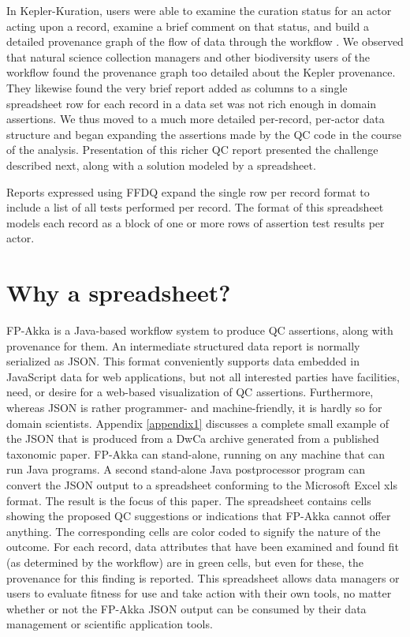 \documentclass{article}
\begin{document}
In Kepler-Kuration, users were able to examine the curation status for an actor acting upon a record, examine a brief comment on that status, and build a detailed 
provenance graph of the flow of data through the workflow \citep{dou_kurator_2012}.   
We observed that natural science collection managers and other biodiversity users of the workflow found the provenance graph too detailed about the Kepler provenance.  They likewise found the very brief report added as columns to a single spreadsheet row for each record in a data set was  not rich enough in domain assertions.  We thus moved to a much more detailed per-record, per-actor data structure and began expanding the assertions made by the QC code in the course of the analysis.  Presentation of this richer QC report presented the challenge described next, along with a solution modeled by a spreadsheet.

Reports expressed using FFDQ expand the single row per record format to include a list of all tests performed per record. The format of this spreadsheet models each record as a block of one or more rows of assertion test results per actor. 

\section{Why a spreadsheet?}



FP-Akka is a Java-based workflow system to produce QC assertions, along with provenance for them. 
An intermediate structured data report is normally serialized as JSON.  This format conveniently supports data embedded in JavaScript data for web applications, but not all interested parties have facilities, need, or desire for a web-based visualization of  QC assertions. Furthermore, whereas JSON is rather programmer- and machine-friendly, it is hardly so for domain scientists.  
Appendix \ref{appendix1} discusses a complete small example of the JSON that is produced from a DwCa archive generated from a published taxonomic paper.
FP-Akka can stand-alone, running on any machine that can run Java programs.  A second stand-alone Java postprocessor program can convert the JSON output to a spreadsheet conforming to the Microsoft Excel xls format. The result is the focus of this paper.  The spreadsheet contains cells showing the proposed QC suggestions or indications that FP-Akka cannot offer anything.  The corresponding cells are color coded to signify the nature of the outcome.  For each record, data attributes that have been examined and found fit (as determined by the workflow) are in green cells, but even for these, the provenance for this finding is reported. This spreadsheet allows data managers or users to evaluate fitness for use and take action with their own tools, no matter whether or not the FP-Akka JSON output can be consumed by their data management or scientific application tools.
\end{document}
